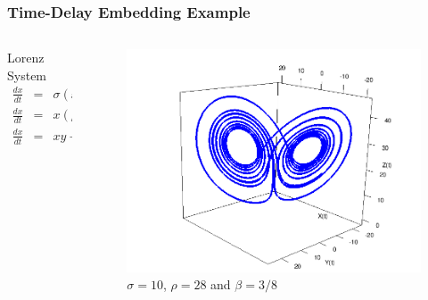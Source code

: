\documentclass{beamer}
\begin{document}
 \begin{frame}
 \frametitle{Time-Delay Embedding Example }
   
  \begin{columns}[onlytextwidth]
    \begin{column}{0.3\textwidth}
Lorenz System
 \begin{eqnarray*} 
  \frac{dx}{dt} &=&\sigma (x-y), \\
  \frac{dx}{dt} &=&x (\rho -z) - y, \\ 
  \frac{dx}{dt} &=&xy - \beta z.
 \end{eqnarray*}
 \end{column} 
  
  \begin{column}{0.63\textwidth}
       \begin{figure}
 \includegraphics[scale=.25]{lorenzattractor}
  \caption{$\sigma=10$, $\rho=28$ and $\beta=3/8$}
       \end{figure}
     \end{column}
  \end{columns}
 \end{frame}
\end{document}
